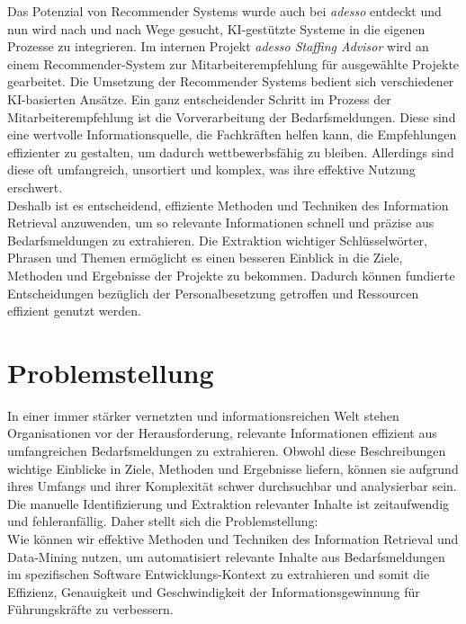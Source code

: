 \documentclass[a4paper,12pt]{scrreprt}
\newcommand{\hiddenchapter}[1]{
	\chapter*{{#1}}
}
\begin{document}
Das Potenzial von Recommender Systems wurde auch bei \emph{adesso} entdeckt und nun wird nach und nach Wege gesucht, KI-gestützte Systeme in die eigenen Prozesse zu integrieren. Im internen Projekt \emph{adesso Staffing Advisor} wird an einem Recommender-System zur Mitarbeiterempfehlung für ausgewählte Projekte gearbeitet. Die Umsetzung der Recommender Systems bedient sich verschiedener KI-basierten Ansätze. Ein ganz entscheidender Schritt im Prozess der Mitarbeiterempfehlung ist die Vorverarbeitung der Bedarfsmeldungen. Diese sind eine wertvolle Informationsquelle, die Fachkräften helfen kann, die Empfehlungen effizienter zu gestalten, um dadurch wettbewerbsfähig zu bleiben. Allerdings sind diese oft umfangreich, unsortiert und komplex, was ihre effektive Nutzung erschwert.\\

Deshalb ist es entscheidend, effiziente Methoden und Techniken des Information Retrieval anzuwenden, um so relevante Informationen schnell und präzise aus Bedarfsmeldungen zu extrahieren. Die Extraktion wichtiger Schlüsselwörter, Phrasen und Themen ermöglicht es einen besseren Einblick in die Ziele, Methoden und Ergebnisse der Projekte zu bekommen. Dadurch können fundierte Entscheidungen bezüglich der Personalbesetzung getroffen und Ressourcen effizient genutzt werden.\\
\hiddenchapter{Problemstellung}
In einer immer stärker vernetzten und informationsreichen Welt stehen Organisationen vor der Herausforderung, relevante Informationen effizient aus umfangreichen Bedarfsmeldungen zu extrahieren. Obwohl diese Beschreibungen wichtige Einblicke in Ziele, Methoden und Ergebnisse liefern, können sie aufgrund ihres Umfangs und ihrer Komplexität schwer durchsuchbar und analysierbar sein. Die manuelle Identifizierung und Extraktion relevanter Inhalte ist zeitaufwendig und fehleranfällig. Daher stellt sich die Problemstellung: \\

Wie können wir effektive Methoden und Techniken des Information Retrieval und Data-Mining nutzen, um automatisiert relevante Inhalte aus Bedarfsmeldungen im spezifischen Software Entwicklungs-Kontext zu extrahieren und somit die Effizienz, Genauigkeit und Geschwindigkeit der Informationsgewinnung für Führungskräfte zu verbessern.\\
\end{document}
